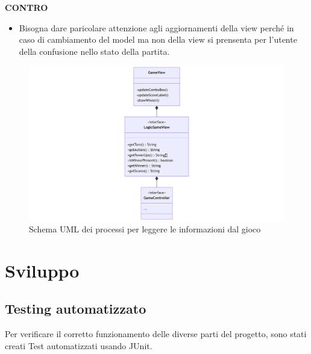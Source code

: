 \documentclass[a4paper,12pt]{report}
\begin{document}
\textbf{CONTRO}
\begin{itemize}
	\item Bisogna dare paricolare attenzione agli aggiornamenti della view perché in caso di cambiamento del model ma non della view si prensenta per l'utente della confusione 
	nello stato della partita.
\end{itemize}
\begin{figure}[H]
	\centering{}
	\includegraphics[width=14cm]{img/TraduzioneInformazioni.png}
	\caption{Schema UML dei processi per leggere le informazioni dal gioco}
	\label{img:Traduzione Informazioni}
\end{figure}

\chapter{Sviluppo}
\section{Testing automatizzato}

Per verificare il corretto funzionamento delle diverse parti del progetto, sono
 stati creati Test automatizzati usando JUnit.
\end{document}
